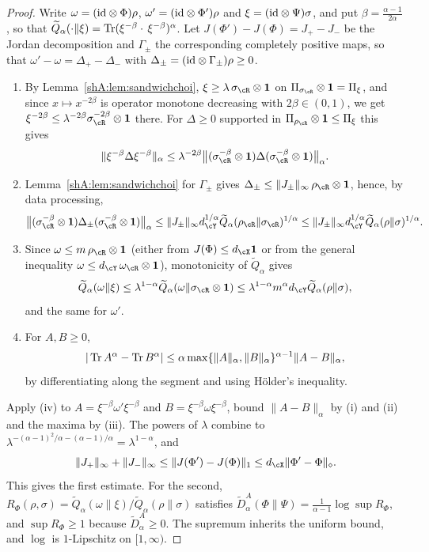\begin{proof}
Write $\omega=(\mathrm{id}\otimes\Phi)\rho$, $\omega'=(\mathrm{id}\otimes\Phi')\rho$ and $\xi=(\mathrm{id}\otimes\Psi)\sigma$, and put $\beta=\frac{\alpha-1}{2\alpha}$, so that $\widetilde Q_\alpha(\cdot\|\xi)=\operatorname{Tr}(\xi^{-\beta}\cdot\,\xi^{-\beta})^\alpha$. Let $J(\Phi')-J(\Phi)=J_+-J_-$ be the Jordan decomposition and $\Gamma_\pm$ the corresponding completely positive maps, so that $\omega'-\omega=\Delta_+-\Delta_-$ with $\Delta_\pm=(\mathrm{id}\otimes\Gamma_\pm)\rho\ge0$.
\begin{enumerate}[label=(\roman*),leftmargin=1.6em]
\item By Lemma~\ref{shA:lem:sandwichchoi}, $\xi\ge\lambda\,\sigma_\cR\otimes\mathbf 1$ on $\Pi_{\sigma_\cR}\otimes\mathbf 1=\Pi_\xi$, and since $x\mapsto x^{-2\beta}$ is operator monotone decreasing with $2\beta\in(0,1)$, we get $\xi^{-2\beta}\le\lambda^{-2\beta}\sigma_\cR^{-2\beta}\otimes\mathbf 1$ there. For $\Delta\ge0$ supported in $\Pi_{\rho_\cR}\otimes\mathbf 1\le\Pi_\xi$ this gives
\[
\|\xi^{-\beta}\Delta\xi^{-\beta}\|_\alpha\le\lambda^{-2\beta}\big\|(\sigma_\cR^{-\beta}\otimes\mathbf 1)\Delta(\sigma_\cR^{-\beta}\otimes\mathbf 1)\big\|_\alpha .
\]
\item Lemma~\ref{shA:lem:sandwichchoi} for $\Gamma_\pm$ gives $\Delta_\pm\le\|J_\pm\|_\infty\,\rho_\cR\otimes\mathbf 1$, hence, by data processing,
\[
\big\|(\sigma_\cR^{-\beta}\otimes\mathbf 1)\Delta_\pm(\sigma_\cR^{-\beta}\otimes\mathbf 1)\big\|_\alpha\le\|J_\pm\|_\infty d_\cY^{1/\alpha}\widetilde Q_\alpha(\rho_\cR\|\sigma_\cR)^{1/\alpha}\le\|J_\pm\|_\infty d_\cY^{1/\alpha}\widetilde Q_\alpha(\rho\|\sigma)^{1/\alpha}.
\]
\item Since $\omega\le m\,\rho_\cR\otimes\mathbf 1$ (either from $J(\Phi)\le d_\cX\mathbf 1$ or from the general inequality $\omega\le d_\cY\,\omega_\cR\otimes\mathbf 1$), monotonicity of $\widetilde Q_\alpha$ gives
\[
\widetilde Q_\alpha(\omega\|\xi)\le\lambda^{1-\alpha}\widetilde Q_\alpha(\omega\|\sigma_\cR\otimes\mathbf 1)\le\lambda^{1-\alpha}m^\alpha d_\cY\widetilde Q_\alpha(\rho\|\sigma),
\]
and the same for $\omega'$.
\item For $A,B\ge0$,
\[
|\operatorname{Tr} A^\alpha-\operatorname{Tr} B^\alpha|\le\alpha\max\{\|A\|_\alpha,\|B\|_\alpha\}^{\alpha-1}\|A-B\|_\alpha,
\]
by differentiating along the segment and using H\"older's inequality.
\end{enumerate}
Apply (iv) to $A=\xi^{-\beta}\omega'\xi^{-\beta}$ and $B=\xi^{-\beta}\omega\xi^{-\beta}$, bound $\|A-B\|_\alpha$ by (i) and (ii) and the maxima by (iii). The powers of $\lambda$ combine to $\lambda^{-(\alpha-1)^2/\alpha-(\alpha-1)/\alpha}=\lambda^{1-\alpha}$, and
\[
\|J_+\|_\infty+\|J_-\|_\infty\le\|J(\Phi')-J(\Phi)\|_1\le d_\cX\|\Phi'-\Phi\|_\diamond.
\]
This gives the first estimate. For the second, $R_\Phi(\rho,\sigma)=\widetilde Q_\alpha(\omega\|\xi)/\widetilde Q_\alpha(\rho\|\sigma)$ satisfies $\widetilde D^A_\alpha(\Phi\|\Psi)=\frac1{\alpha-1}\log\sup R_\Phi$, and $\sup R_\Phi\ge1$ because $\widetilde D^A_\alpha\ge0$. The supremum inherits the uniform bound, and $\log$ is $1$-Lipschitz on $[1,\infty)$.
\end{proof}

